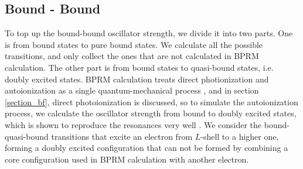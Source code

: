 \subsection{Bound - Bound} \label{section_bound_bound}
To top up the bound-bound oscillator strength, we divide it into two parts. One is from bound states to pure bound states. We calculate all the possible transitions, and only collect the ones that are not calculated in BPRM calculation. The other part is from bound states to quasi-bound states, i.e. doubly excited states. BPRM calculation  treats direct photionization and autoionization as a single quantum-mechanical process \citep{config_2003}, and in section \ref{section_bf}, direct photoionization is discussed, so to simulate the autoionization process, we calculate the oscillator strength from bound to doubly excited states, which is shown to reproduce the resonances very well \citep{ah_1997}. We consider the bound-quasi-bound transitions that excite an electron from $L$-shell to a higher one, forming a doubly excited configuration that can not be formed by combining a core configuration used in BPRM calculation with another electron.

